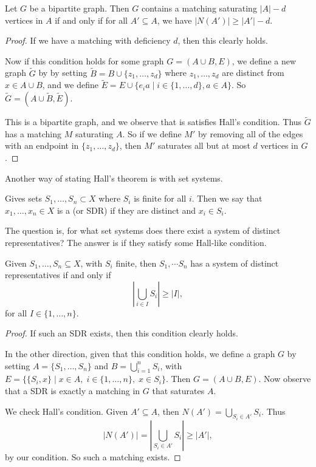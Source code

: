 \documentclass[a4paper]{scrreprt}
\begin{document}
\begin{corollary}
	Let $G$ be a bipartite graph. Then $G$ contains a matching saturating $|A|-d$ vertices in $A$ if and only if for all $A' \subseteq A$, we have $|N(A')| \geq |A'| - d$.
\end{corollary}
\begin{proof}
	If we have a matching with deficiency $d$, then this clearly holds.
	
	Now if this condition holds for some graph $G = (A\cup B, E)$, we define a new graph $\tilde{G}$ by by setting $\tilde{B} = B \cup \{z_1, \dots, z_d\}$ where $z_1, \dots, z_d$ are distinct from $x \in A \cup B$, and we define $\tilde{E} = E \cup \{e_i a \mid i \in \{1, \dots, d\}, a \in A\}$. So $\tilde{G} = (A \cup \tilde{B}, \tilde{E})$.
	
	This is a bipartite graph, and we observe that is satisfies Hall's condition. Thus $\tilde{G}$ has a matching $M$ saturating $A$. So if we define $M'$ by removing all of the edges with an endpoint in $\{z_1, \dots, z_d\}$, then $M'$ saturates all but at most $d$ vertices in $G$.
\end{proof}

Another way of stating Hall's theorem is with set systems.

\begin{definition}
Gives sets $S_1, \dots, S_n \subset X$ where $S_i$ is finite for all $i$. Then we say that $x_1, \dots, x_n \in X$ is a  (or SDR) if they are distinct and $x_i \in S_i$. 
\end{definition}

The question is, for what set systems does there exist a system of distinct representatives? The answer is if they satisfy some Hall-like condition.

\begin{corollary}
	Given $S_1, \dots, S_n \subseteq X$, with $S_i$ finite, then $S_1, \dotsm S_n$ has a system of distinct representatives if and only if
	$$
	\left|\bigcup_{i \in I} S_i\right| \geq |I|,
	 $$
	 for all $I \in \{1, \dots, n\}$.
\end{corollary}
\begin{proof}
	If such an SDR exists, then this condition clearly holds.

	In the other direction, given that this condition holds, we define a graph $G$ by setting $A = \{S_1, \dots, S_n\}$ and $B = \bigcup_{i = 1}^n S_i$, with $E = \{ \{S_i, x\} \mid x \in A,\; i \in \{1, \dots, n\}, \; x \in S_i\}$. Then $G = (A \cup B, E).$ Now observe that a SDR is exactly a matching in $G$ that saturates $A$.

	We check Hall's condition. Given $A' \subseteq A$, then $N(A') = \bigcup_{S_i \in A'} S_i$. Thus
	$$
	\left|N(A')\right| = \left|\bigcup_{S_i \in A'} S_i\right| \geq |A'|,
	$$
	by our condition. So such a matching exists.
\end{proof}
\end{document}
